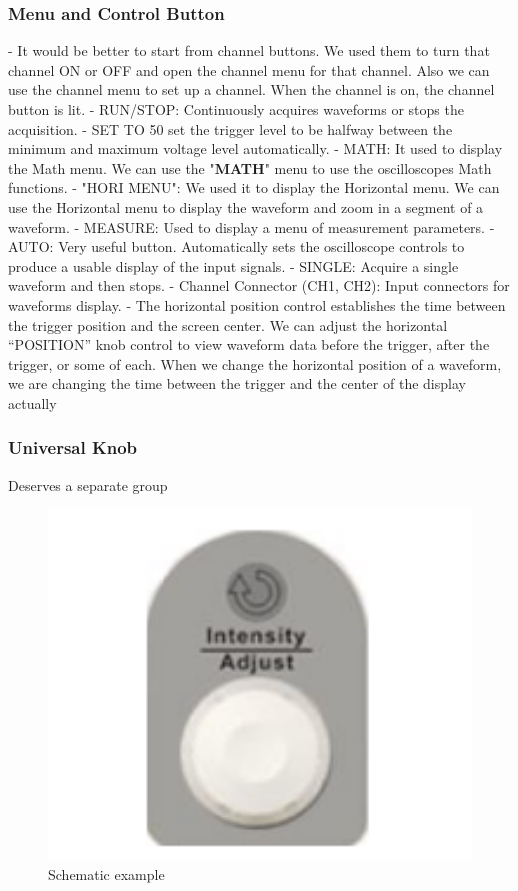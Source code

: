 \subsubsection*{Menu and Control Button}
- It would be better to start from channel buttons. We used them to turn that channel ON or OFF
  and open the channel menu for that channel. Also we can use the channel menu to
  set up a channel. When the channel is on, the channel button is lit.
- RUN/STOP: Continuously acquires waveforms or stops the acquisition.
- SET TO 50%
  set the trigger level to be halfway between the minimum and maximum
  voltage level automatically.
- MATH: It used to display the Math menu. We can use the "\textbf{MATH}" menu to use the
  oscilloscopes Math functions.
- "HORI MENU": We used it to display the Horizontal menu. We can use the Horizontal
  menu to display the waveform and zoom in a segment of a waveform.
- MEASURE: Used to display a menu of measurement parameters.
- AUTO: Very useful button. Automatically sets the oscilloscope controls to produce a usable display
  of the input signals.
- SINGLE: Acquire a single waveform and then stops.
- Channel Connector (CH1, CH2): Input connectors for waveforms display.
- The horizontal position control establishes the time between the trigger position
  and the screen center. We can adjust the horizontal “POSITION” knob control to
  view waveform data before the trigger, after the trigger, or some of each. When
  we change the horizontal position of a waveform, we are changing the time
  between the trigger and the center of the display actually
\subsubsection*{Universal Knob}
Deserves a separate group

\begin{figure}[H]
	\centering
	\includegraphics[width=12cm]{images/17.png}
	\caption{Schematic example}
	\label{fig:wow7}
\end{figure}

